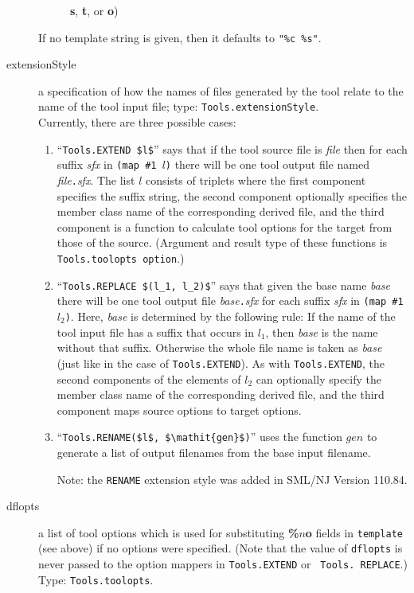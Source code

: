 \begin{description}
\begin{description}
        {\bf s}, {\bf t}, or {\bf o})
      \end{description}%
    If no template string is given, then it defaults to {\tt "\%c \%s"}.
  \item[extensionStyle] a specification of how the names of files
    generated by the tool relate to the name of the tool input file;
    type: {\tt Tools.extensionStyle}. \\
    Currently, there are three possible cases:
    \begin{enumerate}
      \item
        ``\lstinline[mathescape=true]@Tools.EXTEND $l$@'' says that if the tool source file is
        {\it file} then for each suffix {\it sfx} in {\tt (map \#1 $l$)} there
        will be one tool output file named {\it file}{\tt .}{\it sfx}.  The
        list $l$ consists of triplets where the first component specifies the
        suffix string, the second component optionally specifies the
        member class name of the corresponding derived file, and the
        third component is a function to calculate tool options for the 
        target from those of the source. (Argument and result type of these
        functions is {\tt Tools.toolopts option}.)
      \item
        ``\lstinline[mathescape=true]!Tools.REPLACE $(l_1, l_2)$!'' says that given the
        base name {\it base} there will be one tool output file
        {\it base}{\tt .}{\it sfx} for each suffix {\it sfx} in {\tt (map \#1 $l_2$)}.
        Here, {\it base} is determined by the following rule: If the name of the
        tool input file has a suffix that occurs in $l_1$, then {\it base} is
        the name without that suffix.  Otherwise the whole file name is taken
        as {\it base} (just like in the case of {\tt Tools.EXTEND}).  As with
        {\tt Tools.EXTEND}, the second components of the elements of $l_2$ can
        optionally specify the member class name of the corresponding derived
        file, and the third component maps source options to target options.
      \item
        ``\lstinline[mathescape=true]!Tools.RENAME($l$, $\mathit{gen}$)!'' uses the
        function $\mathit{gen}$ to generate a list of output filenames from the
        base input filename.
        
        Note: the \lstinline!RENAME! extension style was added in SML/NJ Version 110.84.
    \end{enumerate}
  \item[dflopts] a list of tool options which is used for
    substituting {\bf \%$n$o} fields in {\tt template} (see above) if no
    options were specified.  (Note that the value of {\tt dflopts} is never
    passed to the option mappers in {\tt Tools.EXTEND} or {\tt
    Tools. REPLACE}.)  Type: {\tt Tools.toolopts}.
\end{description}%

